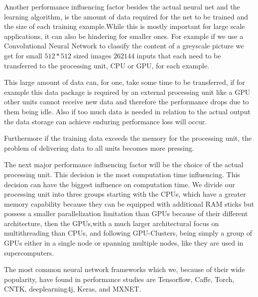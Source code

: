 \documentclass[conference]{IEEEtran}
\begin{document}

Another performance influencing factor besides the actual neural net and the learning algorithm, is the amount of data required for the net to be trained and the size of each training example.While this is mostly important for large scale applications, it can also be hindering for smaller ones. For example if we use a Convolutional Neural Network to classify the content of a greyscale picture we get for small $512*512$ sized images $262144$ inputs that each need to be transferred to the processing unit, CPU or GPU, for each example.

This large amount of data can, for one, take some time to be transferred, if for example this data package is required by an external processing unit like a GPU other units cannot receive new data and therefore the performance drops due to them being idle. Also if too much data is needed in relation to the actual output the data storage can achieve enduring performance loss will occur.  

Furthermore if the training data exceeds the memory for the processing unit, the problem of delivering data to all units becomes more pressing.



The next major performance influencing factor will be the choice of the actual processing unit. This decision is the most computation time influencing. This decision can have the biggest influence on computation time. We divide our processing unit into three groups starting with the CPUs, which have a greater memory capability because they can be equipped with additional RAM sticks but possess a smaller parallelization limitation than GPUs because of their different architecture, then the GPUs,with a much larger architectural focus on multithreading than CPUs, and following GPU-Clusters, being simply a group of GPUs either in a single node or spanning multiple nodes, like they are used in supercomputers.



The most common neural network frameworks which we, because of their wide popularity, have found in performance studies are Tensorflow\cite{abadi2016tensorflow}, Caffe\cite{jia2014caffe}, Torch\cite{collobert2002torch}, CNTK\cite{gitcntk}, deeplearning4j\cite{websitedl4j}, Keras\cite{websitekeras}, and MXNET\cite{websitemxnet}.
\end{document}
